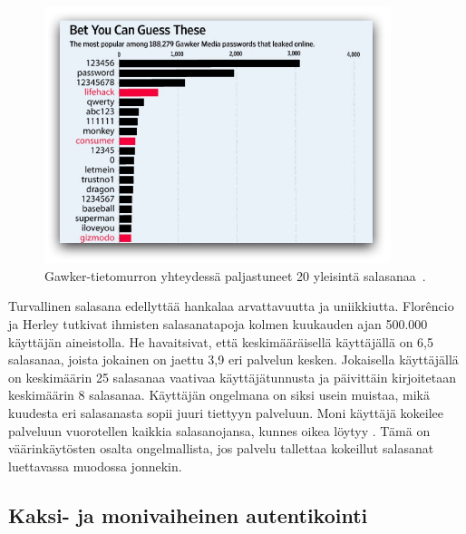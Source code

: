 \documentclass[finnish,gradu]{tktltiki}
\begin{document}
  \begin{figure}
    \centering
    \includegraphics[width=0.9\textwidth]{images/gawker_top20_passwords.jpg}
    \caption{Gawker-tietomurron yhteydessä paljastuneet 20 yleisintä salasanaa~\cite{wsj_gawker_12_2010}.}
    \label{fig:gawker_top20_passwords}
  \end{figure}





  Turvallinen salasana edellyttää hankalaa arvattavuutta ja uniikkiutta. Florêncio ja Herley \cite{study_of_passwords_07} tutkivat ihmisten salasanatapoja kolmen kuukauden ajan 500.000 käyttäjän aineistolla. He havaitsivat, että keskimääräisellä käyttäjällä on 6,5 salasanaa, joista jokainen on jaettu 3,9 eri palvelun kesken. Jokaisella käyttäjällä on keskimäärin 25 salasanaa vaativaa käyttäjätunnusta ja päivittäin kirjoitetaan keskimäärin 8 salasanaa. Käyttäjän ongelmana on siksi usein muistaa, mikä kuudesta eri salasanasta sopii juuri tiettyyn palveluun. Moni käyttäjä kokeilee palveluun vuorotellen kaikkia salasanojansa, kunnes oikea löytyy \cite{study_of_passwords_07}. Tämä on väärinkäytösten osalta ongelmallista, jos palvelu tallettaa kokeillut salasanat luettavassa muodossa jonnekin.


  \subsection{Kaksi- ja monivaiheinen autentikointi} %
  \label{sub:kaksivaiheinen_autentikointi}
\end{document}
